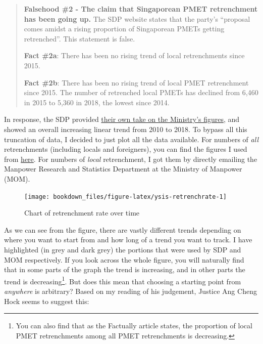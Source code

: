 \documentclass[openany]{book}
\let\rmarkdownfootnote\footnote%
\def\footnote{\protect\rmarkdownfootnote}
\begin{document}
\begin{quote}
\textbf{Falsehood \#2 - The claim that Singaporean PMET retrenchment has
been going up.} The SDP website states that the party's ``proposal comes
amidst a rising proportion of Singaporean PMETs getting retrenched''.
This statement is false.

\textbf{Fact \#2a}: There has been no rising trend of local
retrenchments since 2015.

\textbf{Fact \#2b}: There has been no rising trend of local PMET
retrenchment since 2015. The number of retrenched local PMETs has
declined from 6,460 in 2015 to 5,360 in 2018, the lowest since 2014.
\end{quote}

In response, the SDP provided
\href{https://yoursdp.org/news/sdp-calls-on-josephine-teo-to-retract-correction-directions-and-apologise,-cites-mom's-own-statistics-to-prove-she's-wrong\#site-menu}{their
own take on the Ministry's figures}, and showed an overall increasing
linear trend from 2010 to 2018. To bypass all this truncation of data, I
decided to just plot all the data available. For numbers of \emph{all}
retrenchments (including locals and foreigners), you can find the
figures I used from
\href{https://stats.mom.gov.sg/Pages/RetrenchmentTimeSeries.aspx}{here}.
For numbers of \emph{local} retrenchment, I got them by directly
emailing the Manpower Research and Statistics Department at the Ministry
of Manpower (MOM).

\begin{figure}

{\centering \texttt{[image: bookdown\_files/figure-latex/ysis-retrenchrate-1]} 

}

\caption{Chart of retrenchment rate over time}\label{fig:ysis-retrenchrate}
\end{figure}

As we can see from the figure, there are vastly different trends
depending on where you want to start from and how long of a trend you
want to track. I have highlighted (in grey and dark grey) the portions
that were used by SDP and MOM respectively. If you look across the whole
figure, you will naturally find that in some parts of the graph the
trend is increasing, and in other parts the trend is
decreasing\footnote{You can also find that as the Factually article
  states, the proportion of local PMET retrenchments among all PMET
  retrenchments is decreasing.}. But does this mean that choosing a
starting point from \emph{anywhere} is arbitrary? Based on my reading of
his judgement, Justice Ang Cheng Hock seems to suggest this:
\end{document}
